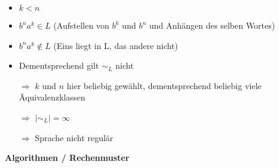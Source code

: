 \begin{itemize}
\begin{itemize}
\begin{itemize}
		\item $k < n$
		\item $b^n a^k \in L$ (Aufstellen von $b^k$ und $b^n$ und Anhängen des selben Wortes)
		\item $b^n a^k \notin L$ (Eins liegt in L, das andere nicht)
		\item Dementsprechend gilt $\sim_L$ nicht
		\item[$\Rightarrow$] $k$ und $n$ hier beliebig gewählt, dementsprechend beliebig viele Äquivalenzklassen
		\item[$\Rightarrow$] $|\sim_L| = \infty$
		\item[$\Rightarrow$] Sprache nicht regulär
		\end{itemize}
		
	\end{itemize}

\end{itemize}

\pagebreak





{\Large \textbf{Algorithmen / Rechenmuster}} 



